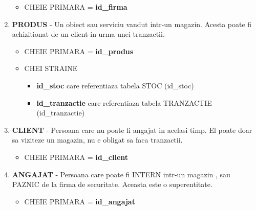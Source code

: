 \begin{enumerate}
    \begin{itemize}
        \item CHEIE PRIMARA = \textbf{id\_firma}
    \end{itemize}

    \vspace{0.5cm}

    \item \textbf{PRODUS}
    - Un obiect sau serviciu vandut intr-un magazin. Acesta poate fi
achizitionat de un client in urma unei tranzactii.

    \begin{itemize}
        \item CHEIE PRIMARA = \textbf{id\_produs}
        \item CHEI STRAINE 
                            \begin{itemize}
                                \item \textbf{id\_stoc} care referentiaza tabela STOC (id\_stoc)
                                \item \textbf{id\_tranzactie} care referentiaza tabela TRANZACTIE (id\_tranzactie)
                            \end{itemize}
            
    \end{itemize}

        \vspace{0.5cm}

        \item \textbf{CLIENT}
    - Persoana care nu poate fi angajat in acelasi timp. El poate doar sa
viziteze un magazin, nu e obligat sa faca tranzactii.

    \begin{itemize}
        \item CHEIE PRIMARA = \textbf{id\_client}
    \end{itemize}

    \vspace{0.5cm}

    \item \textbf{ANGAJAT}
    - Persoana care poate fi INTERN intr-un magazin , sau PAZNIC de la
firma de securitate. Aceasta este o superentitate.

    \begin{itemize}
        \item CHEIE PRIMARA = \textbf{id\_angajat}    
    \end{itemize}

    \vspace{0.5cm}


\end{enumerate}
